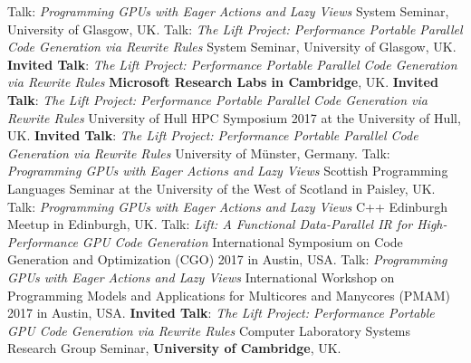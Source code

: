 \documentclass[11pt,a4paper]{moderncv}
\newcommand{\strong}[1]{\textcolor{color1}{\textbf{#1}}}
\begin{document}
         {Talk: \emph{Programming GPUs with Eager Actions and Lazy Views}\newline
         \small System Seminar, University of Glasgow, UK.}
         {Talk: \emph{The Lift Project: Performance Portable Parallel Code Generation via Rewrite Rules}\newline
         \small System Seminar, University of Glasgow, UK.}
         {\strong{Invited Talk}:
          \emph{The Lift Project: Performance Portable Parallel Code Generation via Rewrite Rules}\newline
         \small \strong{Microsoft Research Labs in Cambridge}, UK.}
         {\strong{Invited Talk}:\newline
          \emph{The Lift Project: Performance Portable Parallel Code Generation via Rewrite Rules}\newline
         \small University of Hull HPC Symposium 2017 at the University of Hull, UK.}
         {\strong{Invited Talk}:\newline
          \emph{The Lift Project: Performance Portable Parallel Code Generation via Rewrite Rules}\newline
         \small University of Münster, Germany.}
         {Talk: \emph{Programming GPUs with Eager Actions and Lazy Views}\newline
         \small Scottish Programming Languages Seminar at the University of the West of Scotland in Paisley, UK.}
         {Talk: \emph{Programming GPUs with Eager Actions and Lazy Views}\newline
         \small C++ Edinburgh Meetup in Edinburgh, UK.}
         {Talk: \emph{Lift: A Functional Data-Parallel IR for High-Performance GPU Code Generation}\newline
          \small International Symposium on Code Generation and Optimization (CGO) 2017 in Austin, USA.}
         {Talk: \emph{Programming GPUs with Eager Actions and Lazy Views}\newline
          \small  International Workshop on Programming Models and Applications for Multicores and Manycores (PMAM) 2017 in Austin, USA.}
         {\strong{Invited Talk}: \emph{The Lift Project: Performance Portable GPU Code Generation via Rewrite Rules}\newline
         Computer Laboratory Systems Research Group Seminar, \strong{University of Cambridge}, UK.
         }
\end{document}
